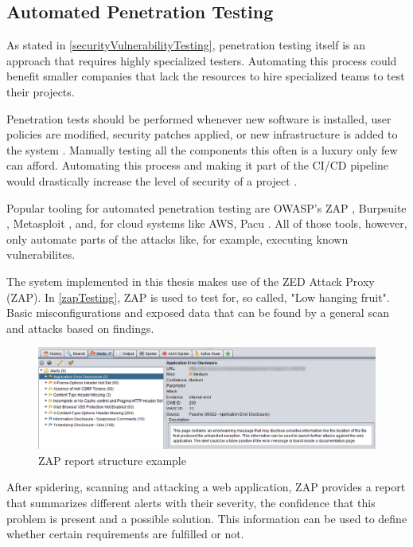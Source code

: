 \subsection{Automated Penetration Testing}
\label{autoPentTesting}
As stated in \ref{securityVulnerabilityTesting}, penetration testing itself is an approach that requires highly specialized testers. Automating this process could benefit smaller companies that lack the resources to hire specialized teams to test their projects.

Penetration tests should be performed whenever new software is installed, user policies are modified, security patches applied, or new infrastructure is added to the system \citep{autoPentestOverview2018}.
Manually testing all the components this often is a luxury only few can afford. Automating this process and making it part of the CI/CD pipeline would drastically increase the level of security of a project \citep{stefinko2016}.

Popular tooling for automated penetration testing are OWASP's ZAP \citep{zapProxy}, Burpsuite \citep{burpSuite}, Metasploit \citep{metasploit}, and, for cloud systems like AWS, Pacu \citep{pacu}. All of those tools, however, only automate parts of the attacks like, for example, executing known vulnerabilites.  

The system implemented in this thesis makes use of the ZED Attack Proxy (ZAP). In \ref{zapTesting}, ZAP is used to test for, so called, "Low hanging fruit". Basic misconfigurations and exposed data that can be found by a general scan and attacks based on findings.

\newpage

\begin{figure}[ht!]
\begin{center}
\includegraphics[width=17cm]{zap_example_report.png}
\end{center}
\caption[ZAP report structure example]{ZAP report structure example}
\end{figure}

After spidering, scanning and attacking a web application, ZAP provides a report that summarizes different alerts with their severity, the confidence that this problem is present and a possible solution. This information can be used to define whether certain requirements are fulfilled or not.


